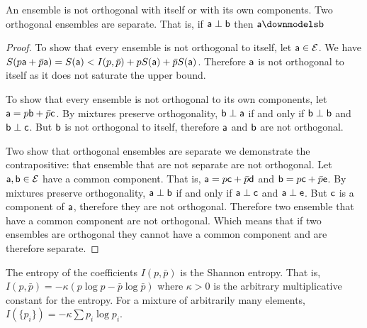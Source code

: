 \begin{prop}
	An ensemble is not orthogonal with itself or with its own components. Two orthogonal ensembles are separate. That is, if $\ens[a] \ortho \ens[b]$ then $\ens[a] \separate \ens[b]$
\end{prop}

\begin{proof}
	To show that every ensemble is not orthogonal to itself, let $\ens[a] \in \Ens$. We have $S(p\ens[a] + \bar{p}\ens[a]) = S(\ens[a]) < I(p,\bar{p}) + p S(\ens[a]) + \bar{p} S(\ens[a])$. Therefore $\ens[a]$ is not orthogonal to itself as it does not saturate the upper bound.
	
	To show that every ensemble is not orthogonal to its own components, let $\ens[a] = p \ens[b] + \bar{p} \ens[c]$. By mixtures preserve orthogonality, $\ens[b] \ortho \ens[a]$ if and only if $\ens[b] \ortho \ens[b]$ and $\ens[b] \ortho \ens[c]$. But $\ens[b]$ is not orthogonal to itself, therefore $\ens[a]$ and $\ens[b]$ are not orthogonal.
	
	Two show that orthogonal ensembles are separate we demonstrate the contrapositive: that ensemble that are not separate are not orthogonal. Let $\ens[a], \ens[b] \in \Ens$ have a common component. That is, $\ens[a] = p \ens[c] + \bar{p} \ens[d]$ and $\ens[b] = p \ens[c] + \bar{p} \ens[e]$. By mixtures preserve orthogonality, $\ens[a] \ortho \ens[b]$ if and only if $\ens[a] \ortho \ens[c]$ and $\ens[a] \ortho \ens[e]$. But $\ens[c]$ is a component of $\ens[a]$, therefore they are not orthogonal. Therefore two ensemble that have a common component are not orthogonal. Which means that if two ensembles are orthogonal they cannot have a common component and are therefore separate.
\end{proof}


\begin{thrm}\label{pm_es_entropyUnique}
	The entropy of the coefficients $I(p,\bar{p})$ is the Shannon entropy. That is, $I(p,\bar{p}) = - \kappa \left(p \log p - \bar{p} \log \bar{p}\right)$ where $\kappa>0$ is the arbitrary multiplicative constant for the entropy. For a mixture of arbitrarily many elements, $I(\{p_i\}) = - \kappa \sum p_i \log p_i$.
\end{thrm}

